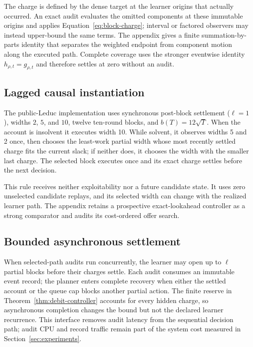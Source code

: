 The charge is defined by the dense target at the learner origins that actually
occurred.  An exact audit evaluates the omitted components at these immutable
origins and applies Equation~\ref{eq:block-charge}; interval or factored
observers may instead upper-bound the same terms.  The appendix gives a finite
summation-by-parts identity that separates the weighted endpoint from component
motion along the executed path.  Complete coverage uses the stronger eventwise
identity $h_{\rho,t}=g_{\rho,t}$ and therefore settles at zero without an
audit.

\subsection{Lagged causal instantiation}

The public-Leduc implementation uses synchronous post-block settlement
($\ell=1$), widths $2$, $5$, and $10$, twelve ten-round blocks, and
$b(T)=12\sqrt T$.  When the account is insolvent it executes width 10.  While
solvent, it observes widths 5 and 2 once, then chooses the least-work partial
width whose most recently settled charge fits the current slack; if neither
does, it chooses the width with the smaller last charge.  The selected block
executes once and its exact charge settles before the next decision.

This rule receives neither exploitability nor a future candidate state.  It
uses zero unselected candidate replays, and its selected width can change with
the realized learner path.  The appendix retains a prospective exact-lookahead
controller as a strong comparator and audits its cost-ordered offer search.

\subsection{Bounded asynchronous settlement}

When selected-path audits run concurrently, the learner may open up to
$\ell$ partial blocks before their charges settle.  Each audit consumes an
immutable event record; the planner enters complete recovery when either the
settled account or the queue cap blocks another partial action.  The finite
reserve in Theorem~\ref{thm:debit-controller} accounts for every hidden charge,
so asynchronous completion changes the bound but not the declared learner
recurrence.  This interface removes audit latency from the sequential decision
path; audit CPU and record traffic remain part of the system cost measured in
Section~\ref{sec:experiments}.
